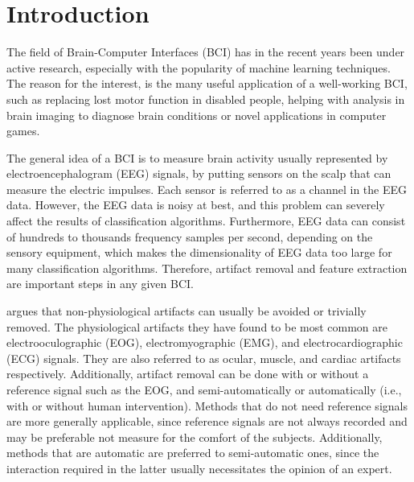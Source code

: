 \section{Introduction}\label{sec:introduction}
The field of Brain-Computer Interfaces (BCI) has in the recent years been under active research, especially with the popularity of machine learning techniques. The reason for the interest, is the many useful application of a well-working BCI, such as replacing lost motor function in disabled people, helping with analysis in brain imaging to diagnose brain conditions or novel applications in computer games. 

The general idea of a BCI is to measure brain activity usually represented by electroencephalogram (EEG) signals, by putting sensors on the scalp that can measure the electric impulses. Each sensor is referred to as a channel in the EEG data. However, the EEG data is noisy at best, and this problem can severely affect the results of classification algorithms. Furthermore, EEG data can consist of hundreds to thousands frequency samples per second, depending on the sensory equipment, which makes the dimensionality of EEG data too large for many classification algorithms. Therefore, artifact removal and feature extraction are important steps in any given BCI.

\cite{uriguen2015eeg} argues that non-physiological artifacts can usually be avoided or trivially removed. The physiological artifacts they have found to be most common are electrooculographic (EOG), electromyographic (EMG), and electrocardiographic (ECG) signals. They are also referred to as ocular, muscle, and cardiac artifacts respectively. Additionally, artifact removal can be done with or without a reference signal such as the EOG, and semi-automatically or automatically (i.e., with or without human intervention). Methods that do not need reference signals are more generally applicable, since reference signals are not always recorded and may be preferable not measure for the comfort of the subjects. Additionally, methods that are automatic are preferred to semi-automatic ones, since the interaction required in the latter usually necessitates the opinion of an expert.

